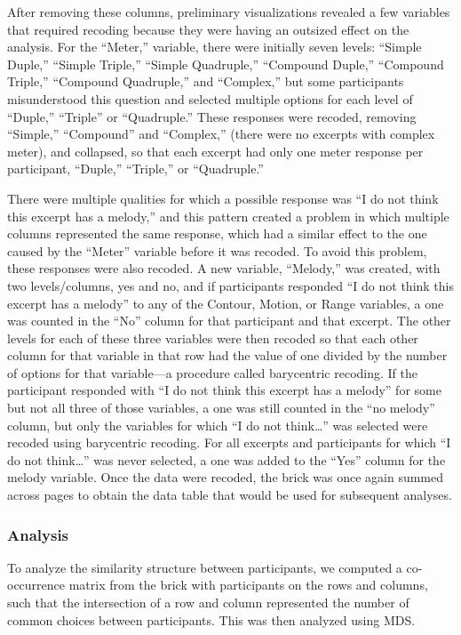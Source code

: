 \documentclass[
  english,
  man,floatsintext]{apa6}
\begin{document}
After removing these columns, preliminary visualizations revealed a few variables that required recoding because they were having an outsized effect on the analysis. For the ``Meter,'' variable, there were initially seven levels: ``Simple Duple,'' ``Simple Triple,'' ``Simple Quadruple,'' ``Compound Duple,'' ``Compound Triple,'' ``Compound Quadruple,'' and ``Complex,'' but some participants misunderstood this question and selected multiple options for each level of ``Duple,'' ``Triple'' or ``Quadruple.'' These responses were recoded, removing ``Simple,'' ``Compound'' and ``Complex,'' (there were no excerpts with complex meter), and collapsed, so that each excerpt had only one meter response per participant, ``Duple,'' ``Triple,'' or ``Quadruple.''

There were multiple qualities for which a possible response was ``I do not think this excerpt has a melody,'' and this pattern created a problem in which multiple columns represented the same response, which had a similar effect to the one caused by the ``Meter'' variable before it was recoded. To avoid this problem, these responses were also recoded. A new variable, ``Melody,'' was created, with two levels/columns, yes and no, and if participants responded ``I do not think this excerpt has a melody'' to any of the Contour, Motion, or Range variables, a one was counted in the ``No'' column for that participant and that excerpt. The other levels for each of these three variables were then recoded so that each other column for that variable in that row had the value of one divided by the number of options for that variable---a procedure called barycentric recoding. If the participant responded with ``I do not think this excerpt has a melody'' for some but not all three of those variables, a one was still counted in the ``no melody'' column, but only the variables for which ``I do not think\ldots{}'' was selected were recoded using barycentric recoding. For all excerpts and participants for which ``I do not think\ldots{}'' was never selected, a one was added to the ``Yes'' column for the melody variable. Once the data were recoded, the brick was once again summed across pages to obtain the data table that would be used for subsequent analyses.

\hypertarget{analysis}{%
\subsubsection{Analysis}\label{analysis}}

To analyze the similarity structure between participants, we computed a co-occurrence matrix from the brick with participants on the rows and columns, such that the intersection of a row and column represented the number of common choices between participants. This was then analyzed using MDS.
\end{document}
